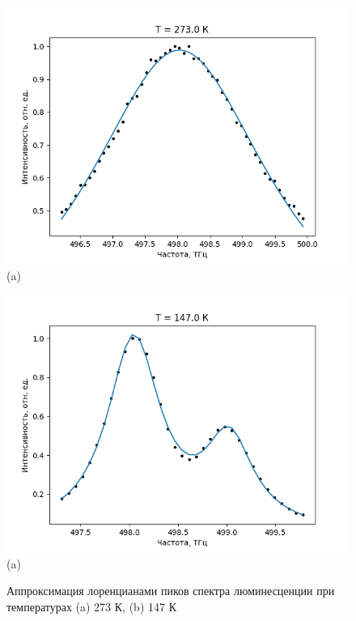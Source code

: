 \begin{figure}[!h]
    \begin{minipage}[h]{0.49\linewidth}
        \includegraphics[width = 1.1 \linewidth]{spectre_local_273K.png}
        \\ (a)
    \end{minipage}
    \hfill
    \begin{minipage}[h]{0.49\linewidth}
        \includegraphics[width = 1.1 \linewidth]{spectre_local_147K.png}
        \\ (a)
    \end{minipage}
    \caption{Аппроксимация лоренцианами пиков спектра люминесценции при температурах
    (a) 273 К, (b) 147 К}
    \label{ris:image1}
\end{figure}